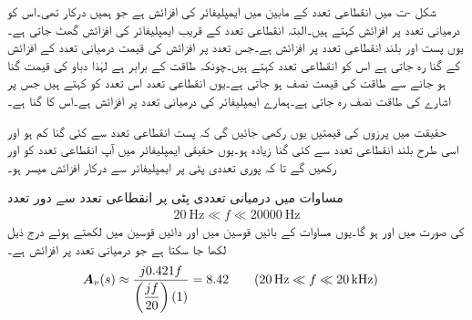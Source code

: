 شکل -ت میں انقطاعی تعدد کے مابین  میں ایمپلیفائر کی افزائش  ہے جو ہمیں درکار تھی۔اس کو درمیانی تعدد پر افزائش کہتے ہیں۔البتہ انقطاعی تعدد کے قریب ایمپلیفائر کی افزائش گھٹ جاتی ہے۔یوں پست اور بلند انقطاعی تعدد پر افزائش  ہے۔جس تعدد پر افزائش کی قیمت درمیانی تعدد کے افزائش کے  گنا رہ جاتی ہے اس کو انقطاعی تعدد کہتے ہیں۔چونکہ طاقت  کے برابر ہے لہٰذا دباو کی قیمت  گنا ہو جانے سے طاقت کی قیمت نصف ہو جاتی ہے۔یوں انقطاعی تعدد اس تعدد کو کہتے ہیں جس پر اشارے کی طاقت نصف رہ جاتی ہے۔ہمارے ایمپلیفائر کی درمیانی تعدد پر افزائش   ہے۔اس کا  گنا   ہے۔

حقیقت میں پرزوں کی قیمتیں یوں رکھی جائیں گی کہ پست انقطاعی تعدد  سے کئی گنا کم ہو اور اسی طرح بلند انقطاعی تعدد  سے کئی گنا زیادہ ہو۔یوں حقیقی ایمپلیفائر میں آپ انقطاعی تعدد کو  اور  رکھیں گے تا کہ پوری تعددی پٹی پر ایمپلیفائر سے درکار افزائش میسر ہو۔ 

مساوات  میں درمیانی تعددی پٹی پر انقطاعی تعدد سے دور  تعدد
\begin{align*}
\SI{20}{\hertz} \ll f \ll \SI{20000}{\hertz}
\end{align*}
کی صورت میں  اور  ہو گا۔یوں مساوات  کے بائیں قوسین میں اور دائیں قوسین میں  لکھتے ہوئے درج ذیل لکھا جا سکتا ہے جو درمیانی تعدد پر افزائش ہے۔
\begin{align*}
{\ensuremath{{\boldsymbol{A}}}}_v(s)&\approx  \dfrac{j 0.421f}{\left(\dfrac{jf }{20}\right)\left(1\right)}=8.42  \quad \quad (\SI{20}{\hertz} \ll f \ll \SI{20}{\kilo\hertz})
\end{align*}

